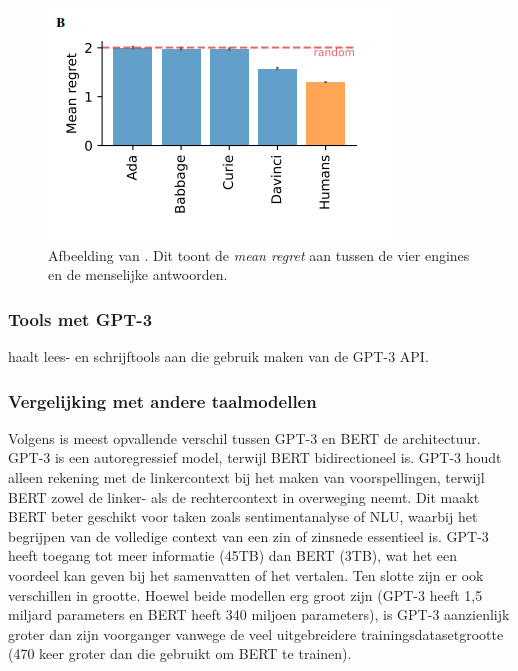 \begin{figure}
	\begin{center}
		\includegraphics{img/chatgpt-engines-mean-regret.png}
		\caption{Afbeelding van \textcite{Binz2023}. Dit toont de \textit{mean regret} aan tussen de vier engines en de menselijke antwoorden.}
	\end{center}
\end{figure}

\subsubsection{Tools met GPT-3}

\textcite{Mottesi2023} haalt lees- en schrijftools aan die gebruik maken van de GPT-3 API.

\subsubsection{Vergelijking met andere taalmodellen}

Volgens \textcite{Mottesi2023} is meest opvallende verschil tussen GPT-3 en BERT de architectuur. GPT-3 is een autoregressief model, terwijl BERT bidirectioneel is. GPT-3 houdt alleen rekening met de linkercontext bij het maken van voorspellingen, terwijl BERT zowel de linker- als de rechtercontext in overweging neemt. Dit maakt BERT beter geschikt voor taken zoals sentimentanalyse of NLU, waarbij het begrijpen van de volledige context van een zin of zinsnede essentieel is. GPT-3 heeft toegang tot meer informatie (45TB) dan BERT (3TB), wat het een voordeel kan geven bij het samenvatten of het vertalen. Ten slotte zijn er ook verschillen in grootte. Hoewel beide modellen erg groot zijn (GPT-3 heeft 1,5 miljard parameters en BERT heeft 340 miljoen parameters), is GPT-3 aanzienlijk groter dan zijn voorganger vanwege de veel uitgebreidere trainingsdatasetgrootte (470 keer groter dan die gebruikt om BERT te trainen).

